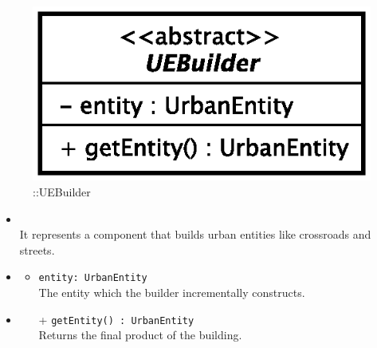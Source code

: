 \begin{figure}[h]
\centering
\includegraphics[scale=0.6,keepaspectratio]{images/solution/u_e_builder.eps}
\caption{\pReactiveBuild::UEBuilder}
\label{fig:sd-app-uebuilder}
\end{figure}
\FloatBarrier
\begin{itemize}
  \item \textbf{\descr} \\
    It represents a component that builds urban entities like crossroads and
    streets.
  \item \textbf{\attrs}
  \begin{itemize}
    \item \texttt{entity: UrbanEntity} \\
The entity which the builder incrementally constructs.
  \end{itemize}
  \item \textbf{\ops}
  \begin{itemize}
    \item[+] \texttt{getEntity() : UrbanEntity} \\
Returns the final product of the building.
  \end{itemize}
\end{itemize}
